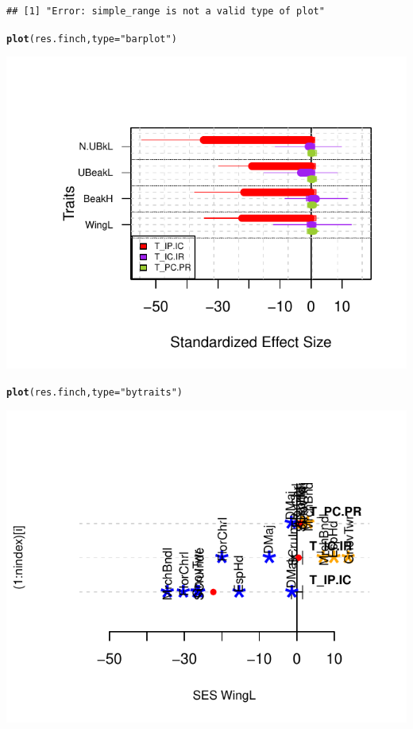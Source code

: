 \documentclass[12pt]{article}\usepackage[]{graphicx}\usepackage[]{color}
\makeatletter
\def\maxwidth{ %
  \ifdim\Gin@nat@width>\linewidth
    \linewidth
  \else
    \Gin@nat@width
  \fi
}
\newcommand{\hlstr}[1]{\textcolor[rgb]{0.192,0.494,0.8}{#1}}%
\newcommand{\hlstd}[1]{\textcolor[rgb]{0.345,0.345,0.345}{#1}}%
\newcommand{\hlkwc}[1]{\textcolor[rgb]{0.333,0.667,0.333}{#1}}%
\newcommand{\hlkwd}[1]{\textcolor[rgb]{0.737,0.353,0.396}{\textbf{#1}}}%
\newenvironment{kframe}{%
 \def\at@end@of@kframe{}%
 \ifinner\ifhmode%
  \def\at@end@of@kframe{\end{minipage}}%
  \begin{minipage}{\columnwidth}%
 \fi\fi%
 \def\FrameCommand##1{\hskip\@totalleftmargin \hskip-\fboxsep
 \colorbox{shadecolor}{##1}\hskip-\fboxsep
     \hskip-\linewidth \hskip-\@totalleftmargin \hskip\columnwidth}%
 \MakeFramed {\advance\hsize-\width
   \@totalleftmargin\z@ \linewidth\hsize
   \@setminipage}}%
 {\par\unskip\endMakeFramed%
 \at@end@of@kframe}
\newenvironment{knitrout}{}{} %
\makeatother
\begin{document}
\begin{knitrout}
{}


\begin{kframe}\begin{verbatim}
## [1] "Error: simple_range is not a valid type of plot"
\end{verbatim}
\begin{alltt}
\hlkwd{plot}\hlstd{(res.finch,} \hlkwc{type}\hlstd{=}\hlstr{"barplot"}\hlstd{)}
\end{alltt}
\end{kframe}

{\centering \includegraphics[width=\maxwidth]{figure/unnamed-chunk-303} 

}


\begin{kframe}\begin{alltt}
\hlkwd{plot}\hlstd{(res.finch,} \hlkwc{type}\hlstd{=}\hlstr{"bytraits"}\hlstd{)}
\end{alltt}
\end{kframe}

{\centering \includegraphics[width=\maxwidth]{figure/unnamed-chunk-304} 

}
\end{knitrout}
\end{document}
